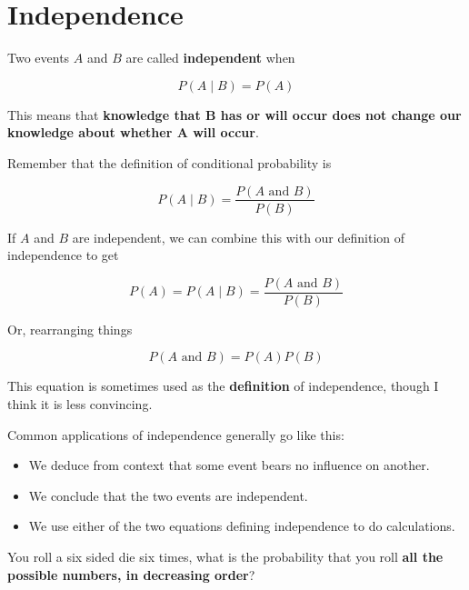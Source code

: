 \section{Independence}

\begin{frame}

Two events $A$ and $B$ are called \textbf{independent} when

$$ P(A \mid B) = P(A) $$

This means that \textbf{knowledge that B has or will occur does not change our
knowledge about whether A will occur}.

\end{frame}
%

%
\begin{frame}

Remember that the definition of conditional probability is

$$ P(A \mid B) = \frac{P(A \text{ and } B)}{P(B)} $$

If $A$ and $B$ are independent, we can combine this with our definition of independence to get

$$ P(A) = P(A \mid B) = \frac{P(A \text{ and } B)}{P(B)} $$

Or, rearranging things

$$ P(A \text{ and } B) = P(A) P(B) $$

This equation is sometimes used as the \textbf{definition} of independence,
though I think it is less convincing.

\end{frame}
%

%
\begin{frame}

Common applications of independence generally go like this:

\begin{itemize}
\item We deduce from context that some event bears no influence on another.
\item We conclude that the two events are independent.
\item We use either of the two equations defining independence to do
calculations.
\end{itemize}

\end{frame}
%

%
\begin{frame}

You roll a six sided die six times, what is the probability that you roll
\textbf{all
the possible numbers, in decreasing order}?

\end{frame}
%

